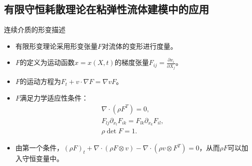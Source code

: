\documentclass[mathserif]{beamer}
\begin{document}
\subsection{有限守恒耗散理论在粘弹性流体建模中的应用}



\begin{frame}{连续介质的形变描述}
\begin{itemize}
	\item<1-> 有限形变理论采用形变张量$F$对流体的变形进行度量。
	\item<2-> $F$的定义为运动函数$x=x(X,t)$的梯度张量$F_{ij} = \frac{\partial x_i}{\partial X_j}$。
	\item<3-> $F$的运动方程为$F_t + v \cdot \nabla F = \nabla v F$。
	\item<4-> $F$满足力学适应性条件：
	\begin{subequations}
\begin{align*}
\nabla \cdot (\rho F^T) = 0,\\%
 F_{lj} \partial_{x_l} F_{ik} = F_{lk} \partial_{x_k} F_{il} ,\\%
 \rho \det F = 1.%
\end{align*}
\end{subequations}
\item<5-> 由第一个条件，$(\rho F)_t + \nabla \cdot (\rho F \otimes v) - \nabla \cdot (\rho v \otimes F^T) =0$，从而$\rho F$可以加入守恒变量中。
\end{itemize}
\end{frame}
\end{document}
